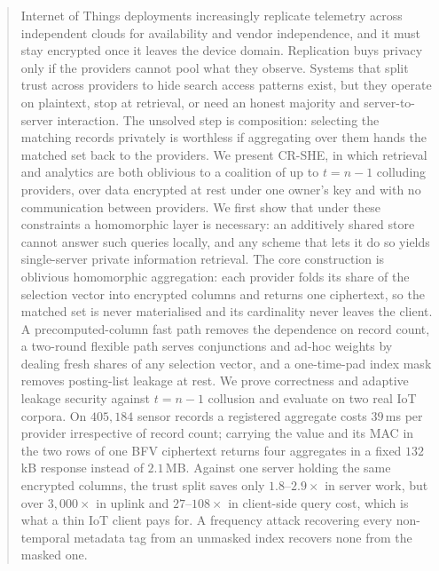 \documentclass[a4paper,fleqn]{cas-dc}
\begin{document}
\begin{abstract}
Internet of Things deployments increasingly replicate telemetry across
independent clouds for availability and vendor independence, and it must stay
encrypted once it leaves the device domain. Replication buys privacy only if
the providers cannot pool what they observe. Systems that split trust across
providers to hide search access patterns exist, but they operate on plaintext,
stop at retrieval, or need an honest majority and server-to-server
interaction. The unsolved step is composition: selecting the matching records
privately is worthless if aggregating over them hands the matched set back to
the providers. We present CR-SHE, in which retrieval and analytics are both
oblivious to a coalition of up to $t=n-1$ colluding providers, over data
encrypted at rest under one owner's key and with no communication between
providers. We first show that under these constraints a homomorphic layer is
necessary: an additively shared store cannot answer such queries locally, and
any scheme that lets it do so yields single-server private information
retrieval. The core construction is oblivious homomorphic aggregation: each
provider folds its share of the selection vector into encrypted columns and
returns one ciphertext, so the matched set is never materialised and its
cardinality never leaves the client. A precomputed-column fast path removes the
dependence on record count, a two-round flexible path serves conjunctions and
ad-hoc weights by dealing fresh shares of any selection vector, and a
one-time-pad index mask removes posting-list leakage at rest. We prove
correctness and adaptive leakage security against $t=n-1$ collusion and
evaluate on two real IoT corpora. On $405{,}184$ sensor records a registered
aggregate costs $39$\,ms per provider irrespective of record count; carrying
the value and its MAC in the two rows of one BFV ciphertext returns four
aggregates in a fixed $132$\,kB response instead of $2.1$\,MB. Against one
server holding the same encrypted columns, the trust split saves only
$1.8$--$2.9\times$ in server work, but over $3{,}000\times$ in uplink and
$27$--$108\times$ in client-side query cost, which is what a thin IoT client
pays for. A frequency
attack recovering every non-temporal metadata tag from an unmasked index
recovers none from the masked one.
\end{abstract}
\end{document}
